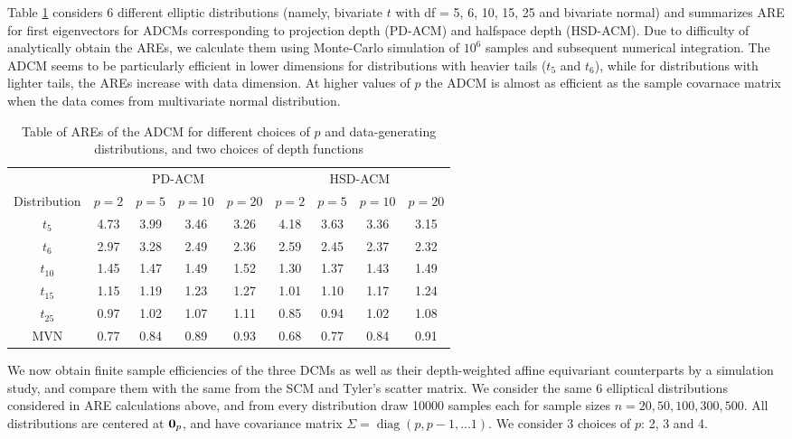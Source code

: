 \documentclass[fleqn,11pt]{article}
\DeclareMathOperator*{\diag}{diag}
\begin{document}
Table \ref{table:AREtable} considers 6 different elliptic distributions (namely, bivariate $t$ with df = 5, 6, 10, 15, 25 and bivariate normal) and summarizes ARE for first eigenvectors for ADCMs corresponding to projection depth (PD-ACM) and halfspace depth (HSD-ACM). Due to difficulty of analytically obtain the AREs, we calculate them using Monte-Carlo simulation of $10^6$ samples and subsequent numerical integration. The ADCM seems to be particularly efficient in lower dimensions for distributions with heavier tails ($t_5$ and $t_6$), while for distributions with lighter tails, the AREs increase with data dimension. At higher values of $p$ the ADCM is almost as efficient as the sample covarnace matrix when the data comes from multivariate normal distribution.

\begin{table}[t]
\centering
    \begin{tabular}{c|cccc|cccc}
    \hline
    & \multicolumn{4}{c|}{PD-ACM} & \multicolumn{4}{c}{HSD-ACM} \\\cline{2-9}
    Distribution & $p=2$  & $p=5$  & $p=10$ & $p=20$ & $p=2$  & $p=5$  & $p=10$ & $p=20$ \\ \hline
    $t_5$           & 4.73 & 3.99 & 3.46 & 3.26 & 4.18 & 3.63 & 3.36 & 3.15 \\
    $t_6$           & 2.97 & 3.28 & 2.49 & 2.36 & 2.59 & 2.45 & 2.37 & 2.32 \\
    $t_{10}$          & 1.45 & 1.47 & 1.49 & 1.52 & 1.30 & 1.37 & 1.43 & 1.49 \\
    $t_{15}$          & 1.15 & 1.19 & 1.23 & 1.27 & 1.01 & 1.10 & 1.17 & 1.24 \\
    $t_{25}$          & 0.97 & 1.02 & 1.07 & 1.11 & 0.85 & 0.94 & 1.02 & 1.08 \\
    MVN          & 0.77 & 0.84 & 0.89 & 0.93 & 0.68 & 0.77 & 0.84 & 0.91 \\ \hline
    \end{tabular}
    \caption{Table of AREs of the ADCM for different choices of $p$ and data-generating distributions, and two choices of depth functions}
    \label{table:AREtable}
\end{table}

We now obtain finite sample efficiencies of the three DCMs as well as their depth-weighted affine equivariant counterparts by a simulation study, and compare them with the same from the SCM and Tyler's scatter matrix. We consider the same 6 elliptical distributions considered in ARE calculations above, and from every distribution draw 10000 samples each for sample sizes $n = 20, 50, 100, 300, 500$. All distributions are centered at ${\bf 0}_p$, and have covariance matrix $\Sigma = \diag(p,p-1,...1)$. We consider 3 choices of $p$: 2, 3 and 4.
\end{document}
